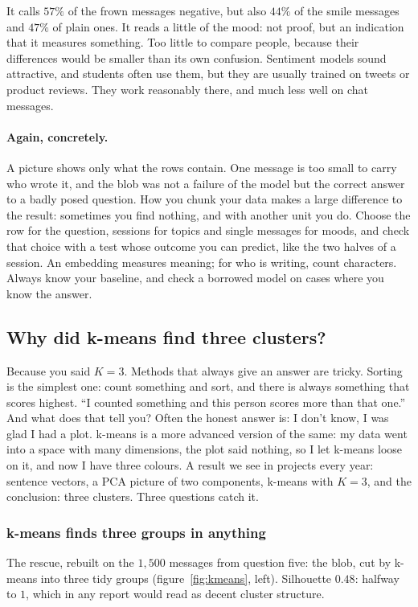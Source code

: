 \documentclass[12pt, a4paper]{article}
\theoremstyle{definition}
\theoremstyle{remark}
\newcommand{\againconcretely}{\paragraph{Again, concretely.}}
\begin{document}
It calls $57\%$ of the frown messages negative, but also $44\%$ of the smile messages and $47\%$ of plain ones. It reads a little of the mood: not proof, but an indication that it measures something. Too little to compare people, because their differences would be smaller than its own confusion. Sentiment models sound attractive, and students often use them, but they are usually trained on tweets or product reviews. They work reasonably there, and much less well on chat messages.

\againconcretely
A picture shows only what the rows contain. One message is too small to carry who wrote it, and the blob was not a failure of the model but the correct answer to a badly posed question. How you chunk your data makes a large difference to the result: sometimes you find nothing, and with another unit you do. Choose the row for the question, sessions for topics and single messages for moods, and check that choice with a test whose outcome you can predict, like the two halves of a session. An embedding measures meaning; for who is writing, count characters. Always know your baseline, and check a borrowed model on cases where you know the answer.

\subsection{Why did k-means find three clusters?}
\label{sec:kmeans}
Because you said $K = 3$. Methods that always give an answer are tricky. Sorting is the simplest one: count something and sort, and there is always something that scores highest. ``I counted something and this person scores more than that one.'' And what does that tell you? Often the honest answer is: I don't know, I was glad I had a plot. k-means is a more advanced version of the same: my data went into a space with many dimensions, the plot said nothing, so I let k-means loose on it, and now I have three colours. A result we see in projects every year: sentence vectors, a PCA picture of two components, k-means with $K = 3$, and the conclusion: three clusters. Three questions catch it.

\subsubsection{k-means finds three groups in anything}
The rescue, rebuilt on the $1{,}500$ messages from question five: the blob, cut by k-means into three tidy groups (figure~\ref{fig:kmeans}, left). Silhouette $0.48$: halfway to $1$, which in any report would read as decent cluster structure.
\end{document}
